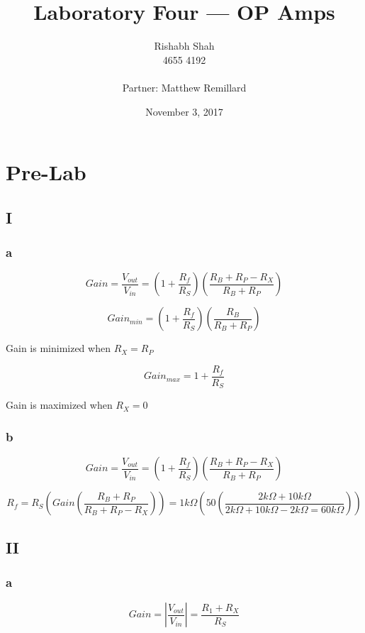 \documentclass[10pt]{article}
\begin{document}
\title{Laboratory Four --- OP Amps}
\date{November 3, 2017}
\author{Rishabh Shah\\ 4655 4192\\ \\ Partner: Matthew Remillard}
\maketitle
\newpage

\section*{Pre-Lab}
\subsection*{I}
\subsubsection*{a}
$$Gain = \frac{V_{out}}{V_{in}} = (1+\frac{R_f}{R_S})(\frac{R_B+R_P-R_X}{R_B+R_P})$$

$$Gain_{min} = (1+\frac{R_f}{R_S})(\frac{R_B}{R_B+R_P})$$

\begin{center}	
Gain is minimized when $R_X = R_P$
\end{center}

$$Gain_{max} = 1+\frac{R_f}{R_S}$$

\begin{center}
Gain is maximized when $R_X = 0$
\end{center}

\subsubsection*{b}
$$Gain = \frac{V_{out}}{V_{in}} = (1+\frac{R_f}{R_S})(\frac{R_B+R_P-R_X}{R_B+R_P})$$

$$R_f = R_S(Gain(\frac{R_B+R_P}{R_B+R_P-R_X})) = 1k\Omega(50(\frac{2k\Omega+10k\Omega}{2k\Omega+10k\Omega-2k\Omega = 60k\Omega}))$$

\subsection*{II}
\subsubsection*{a}
$$Gain = |\frac{V_{out}}{V_{in}}| = \frac{R_1+R_X}{R_S}$$
\end{document}
